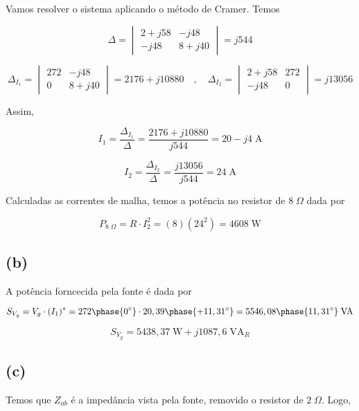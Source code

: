 \endgroup

Vamos resolver o sistema aplicando o método de Cramer. Temos

\begingroup
\renewcommand*{\arraystretch}{3}

\[ 
    \Delta
    =
    \begin{vmatrix}
        2 + j58 & -j48    \\
        -j48    & 8 + j40
    \end{vmatrix}
    =
    j544
\]

\[
    \Delta_{I_1}
    =
    \begin{vmatrix}
        272 & -j48    \\
        0    & 8 + j40
    \end{vmatrix}
    =
    2176 + j10880  \quad , \quad 
    \Delta_{I_2}
    =
    \begin{vmatrix}
        2 + j58 & 272    \\
        -j48    & 0
    \end{vmatrix}
    =
    j13056
\]

\endgroup

Assim, 

\[ I_1 = \frac{\Delta_{I_1}}{\Delta} = \frac{2176 + j10880}{j544} = 20 - j4 \;\textrm{A} \]

\[ I_2 = \frac{\Delta_{I_2}}{\Delta} = \frac{j13056}{j544} = 24 \;\textrm{A} \]

Calculadas as correntes de malha, temos a potência no resistor de $8 \;\Omega$ dada por

\[ \boxed{P_{8 \;\Omega} = R \cdot I_2^2 = (8)(24^2) = 4608 \;\textrm{W}}  \]

\subsection*{(b)}

A potência forncecida pela fonte é dada por

\[ S_{V_g} = V_g \cdot (I_1)^* = 272\phase{0^{\circ}} \cdot 20,39\phase{+11,31^{\circ}} = 5546,08\phase{11,31^{\circ}} \;\textrm{VA} \]

\[ \boxed{S_{V_g} = 5438,37 \;\textrm{W} + j1087,6 \;\textrm{VA}_R} \]

\subsection*{(c)}

Temos que $Z_{ab}$ é a impedância vista pela fonte, removido o resistor de $2 \;\Omega$. Logo,

